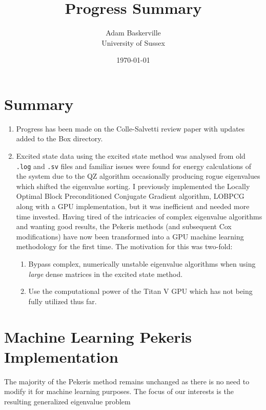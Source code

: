\documentclass[12pt]{article}
\let\cite=\supercite
\begin{document}
\title{\vspace{-1cm}Progress Summary}
\author{Adam Baskerville\\
	University of Sussex}
\date{\today}
\maketitle

\section{Summary}

\begin{enumerate}
  \item Progress has been made on the Colle-Salvetti review paper with updates added to the Box directory.
  \item Excited state data using the  excited state method was analysed from old \texttt{.log} and \texttt{.sv} files and familiar issues were found for energy calculations of the  system due to the QZ algorithm occasionally producing rogue eigenvalues which shifted the eigenvalue sorting. I previously implemented the Locally Optimal Block Preconditioned Conjugate Gradient algorithm, LOBPCG along with a GPU implementation, but it was inefficient and needed more time invested. Having tired of the intricacies of complex eigenvalue algorithms and wanting good results, the Pekeris methods\cite{Pekeris:1958,Pekeris:1962uv} (and subsequent Cox modifications\cite{Cox:1994a}) have now been transformed into a GPU machine learning methodology for the first time. The motivation for this was two-fold:
  \begin{enumerate}
    \item Bypass complex, numerically unstable eigenvalue algorithms when using \textit{large} dense matrices in the excited state method.
    \item Use the computational power of the Titan V GPU which has not being fully utilized thus far. 
  \end{enumerate} 
\end{enumerate}

\section{Machine Learning Pekeris Implementation}

The majority of the Pekeris method remains unchanged as there is no need to modify it for machine learning purposes. The focus of our interests is the resulting generalized eigenvalue problem 
\end{document}
